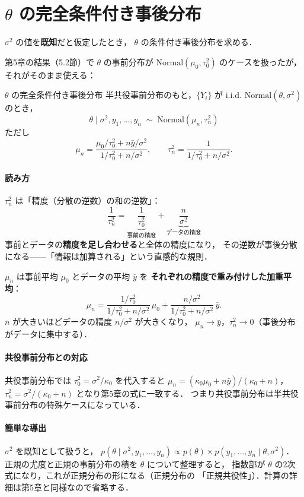 \documentclass[lualatex,ja=standard,a4paper,12pt]{bxjsarticle}
\begin{document}
\section{$\theta$ の完全条件付き事後分布}

$\sigma^2$ の値を\textbf{既知}だと仮定したとき，
$\theta$ の条件付き事後分布を求める．

\medskip
第5章の結果（5.2節）で $\theta$ の事前分布が $\mathrm{Normal}(\mu_0, \tau_0^2)$
のケースを扱ったが，それがそのまま使える：

\begin{thmbox}{$\theta$ の完全条件付き事後分布}
半共役事前分布のもと，$\{Y_i\}$ が i.i.d. $\mathrm{Normal}(\theta, \sigma^2)$ のとき，
\[
  \theta \mid \sigma^2, y_1, \ldots, y_n
  \;\sim\; \mathrm{Normal}(\mu_n, \tau_n^2)
\]
ただし
\[
  \mu_n = \frac{\mu_0/\tau_0^2 + n\bar{y}/\sigma^2}{1/\tau_0^2 + n/\sigma^2},
  \qquad
  \tau_n^2 = \frac{1}{1/\tau_0^2 + n/\sigma^2}.
\]
\end{thmbox}

\paragraph{読み方}
$\tau_n^2$ は「精度（分散の逆数）の和の逆数」：
\[
  \frac{1}{\tau_n^2} = \underbrace{\frac{1}{\tau_0^2}}_{\text{事前の精度}} + \underbrace{\frac{n}{\sigma^2}}_{\text{データの精度}}
\]
事前とデータの\textbf{精度を足し合わせる}と全体の精度になり，
その逆数が事後分散になる——「情報は加算される」という直感的な規則．

\medskip
$\mu_n$ は事前平均 $\mu_0$ とデータの平均 $\bar{y}$ を
\textbf{それぞれの精度で重み付けした加重平均}：
\[
  \mu_n
  = \frac{1/\tau_0^2}{1/\tau_0^2 + n/\sigma^2}\,\mu_0
  + \frac{n/\sigma^2}{1/\tau_0^2 + n/\sigma^2}\,\bar{y}.
\]
$n$ が大きいほどデータの精度 $n/\sigma^2$ が大きくなり，
$\mu_n \to \bar{y}$，$\tau_n^2 \to 0$（事後分布がデータに集中する）．

\paragraph{共役事前分布との対応}
共役事前分布では $\tau_0^2 = \sigma^2/\kappa_0$ を代入すると
$\mu_n = (\kappa_0 \mu_0 + n\bar{y})/(\kappa_0 + n)$，
$\tau_n^2 = \sigma^2/(\kappa_0 + n)$ となり第5章の式に一致する．
つまり共役事前分布は半共役事前分布の特殊ケースになっている．

\paragraph{簡単な導出}
$\sigma^2$ を既知として扱うと，
$p(\theta \mid \sigma^2, y_1, \ldots, y_n) \propto p(\theta) \times p(y_1,\ldots,y_n \mid \theta, \sigma^2)$．
正規の尤度と正規の事前分布の積を $\theta$ について整理すると，
指数部が $\theta$ の2次式になり，これが正規分布の形になる（正規分布の
「正規共役性」）．計算の詳細は第5章と同様なので省略する．
\end{document}
